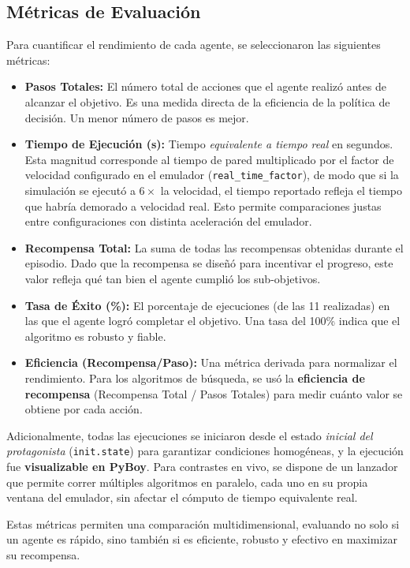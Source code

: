 \documentclass[12pt, oneside, openany]{book}
\begin{document}
\subsection{Métricas de Evaluación}
Para cuantificar el rendimiento de cada agente, se seleccionaron las siguientes métricas:
\begin{itemize}
    \item \textbf{Pasos Totales:} El número total de acciones que el agente realizó antes de alcanzar el objetivo. Es una medida directa de la eficiencia de la política de decisión. Un menor número de pasos es mejor.
    \item \textbf{Tiempo de Ejecución (s):} Tiempo \textit{equivalente a tiempo real} en segundos. Esta magnitud corresponde al tiempo de pared multiplicado por el factor de velocidad configurado en el emulador (\texttt{real\_time\_factor}), de modo que si la simulación se ejecutó a $6\times$ la velocidad, el tiempo reportado refleja el tiempo que habría demorado a velocidad real. Esto permite comparaciones justas entre configuraciones con distinta aceleración del emulador.
    \item \textbf{Recompensa Total:} La suma de todas las recompensas obtenidas durante el episodio. Dado que la recompensa se diseñó para incentivar el progreso, este valor refleja qué tan bien el agente cumplió los sub-objetivos.
    \item \textbf{Tasa de Éxito (\%):} El porcentaje de ejecuciones (de las 11 realizadas) en las que el agente logró completar el objetivo. Una tasa del 100\% indica que el algoritmo es robusto y fiable.
    \item \textbf{Eficiencia (Recompensa/Paso):} Una métrica derivada para normalizar el rendimiento. Para los algoritmos de búsqueda, se usó la \textbf{eficiencia de recompensa} (Recompensa Total / Pasos Totales) para medir cuánto valor se obtiene por cada acción.
\end{itemize}

Adicionalmente, todas las ejecuciones se iniciaron desde el estado \textit{inicial del protagonista} (\texttt{init.state}) para garantizar condiciones homogéneas, y la ejecución fue \textbf{visualizable en PyBoy}. Para contrastes en vivo, se dispone de un lanzador que permite correr múltiples algoritmos en paralelo, cada uno en su propia ventana del emulador, sin afectar el cómputo de tiempo equivalente real.

Estas métricas permiten una comparación multidimensional, evaluando no solo si un agente es rápido, sino también si es eficiente, robusto y efectivo en maximizar su recompensa.
\end{document}
